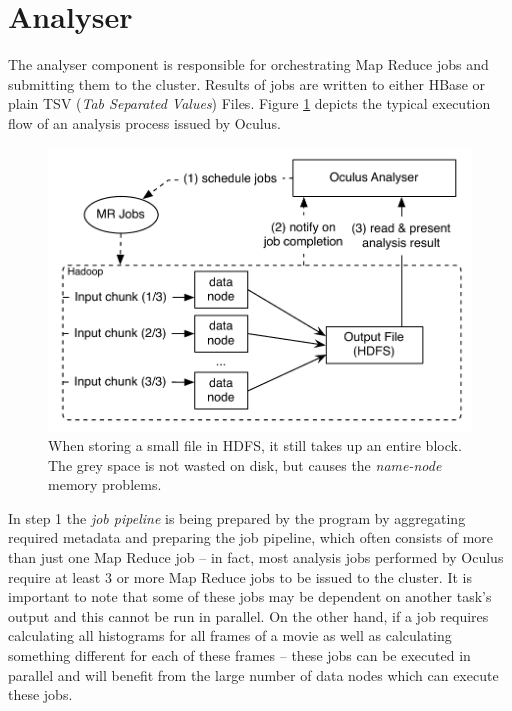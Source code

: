 
\section{Analyser}
The analyser component is responsible for orchestrating Map Reduce jobs and submitting them to the cluster. Results of jobs are written to either HBase or plain TSV (\textit{Tab Separated Values}) Files. Figure \ref{fig:analyser-high-level} depicts the typical execution flow of an analysis process issued by Oculus.

\begin{figure}[ch!]
  \centering
  \includegraphics[scale=0.9]{diagrams/analyser-high-level.pdf}
  \caption{When storing a small file in HDFS, it still takes up an entire block. The grey space is not wasted on disk, but causes the \textit{name-node} memory problems.}
  \label{fig:analyser-high-level}
\end{figure}

In step 1 the \textit{job pipeline} is being prepared by the program by aggregating required metadata and preparing the job pipeline, which often consists of more than just one Map Reduce job -- in fact, most analysis jobs performed by Oculus require at least 3 or more Map Reduce jobs to be issued to the cluster. It is important to note that some of these jobs may be dependent on another task's output and this cannot be run in parallel. On the other hand, if a job requires calculating all histograms for all frames of a movie as well as calculating something different for each of these frames -- these jobs can be executed in parallel and will benefit from the large number of data nodes which can execute these jobs.

